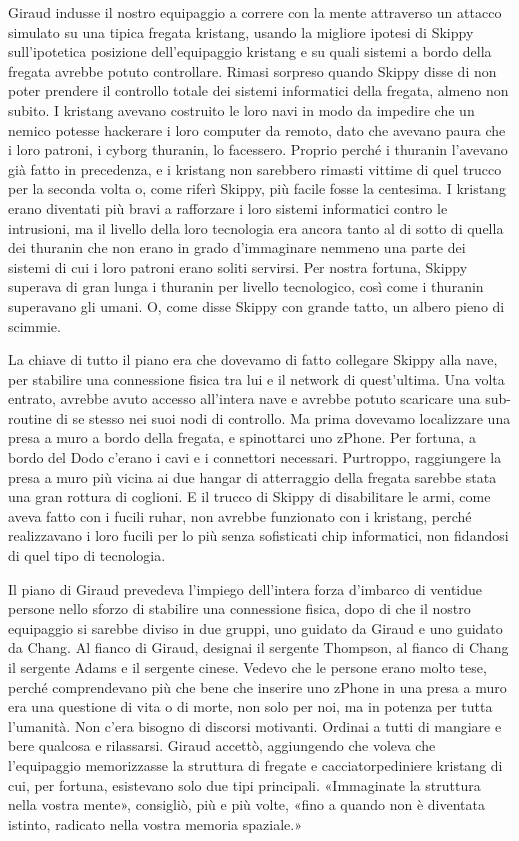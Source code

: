 Giraud indusse il nostro equipaggio a correre con la mente attraverso un
attacco simulato su una tipica fregata kristang, usando la migliore
ipotesi di Skippy sull'ipotetica posizione dell'equipaggio kristang e su
quali sistemi a bordo della fregata avrebbe potuto controllare. Rimasi
sorpreso quando Skippy disse di non poter prendere il controllo totale
dei sistemi informatici della fregata, almeno non subito. I kristang
avevano costruito le loro navi in modo da impedire che un nemico potesse
hackerare i loro computer da remoto, dato che avevano paura che i loro
patroni, i cyborg thuranin, lo facessero. Proprio perché i thuranin
l'avevano già fatto in precedenza, e i kristang non sarebbero rimasti
vittime di quel trucco per la seconda volta o, come riferì Skippy, più
facile fosse la centesima. I kristang erano diventati più bravi a
rafforzare i loro sistemi informatici contro le intrusioni, ma il
livello della loro tecnologia era ancora tanto al di sotto di quella dei
thuranin che non erano in grado d'immaginare nemmeno una parte dei
sistemi di cui i loro patroni erano soliti servirsi. Per nostra fortuna,
Skippy superava di gran lunga i thuranin per livello tecnologico, così
come i thuranin superavano gli umani. O, come disse Skippy con grande
tatto, un albero pieno di scimmie.

La chiave di tutto il piano era che dovevamo di fatto collegare Skippy
alla nave, per stabilire una connessione fisica tra lui e il network di
quest'ultima. Una volta entrato, avrebbe avuto accesso all'intera nave e
avrebbe potuto scaricare una sub-routine di se stesso nei suoi nodi di
controllo. Ma prima dovevamo localizzare una presa a muro a bordo della
fregata, e spinottarci uno zPhone. Per fortuna, a bordo del Dodo c'erano
i cavi e i connettori necessari. Purtroppo, raggiungere la presa a muro
più vicina ai due hangar di atterraggio della fregata sarebbe stata una
gran rottura di coglioni. E il trucco di Skippy di disabilitare le armi,
come aveva fatto con i fucili ruhar, non avrebbe funzionato con i
kristang, perché realizzavano i loro fucili per lo più senza sofisticati
chip informatici, non fidandosi di quel tipo di tecnologia.

Il piano di Giraud prevedeva l'impiego dell'intera forza d'imbarco di
ventidue persone nello sforzo di stabilire una connessione fisica, dopo
di che il nostro equipaggio si sarebbe diviso in due gruppi, uno guidato
da Giraud e uno guidato da Chang. Al fianco di Giraud, designai il
sergente Thompson, al fianco di Chang il sergente Adams e il sergente
cinese. Vedevo che le persone erano molto tese, perché comprendevano più
che bene che inserire uno zPhone in una presa a muro era una questione
di vita o di morte, non solo per noi, ma in potenza per tutta l'umanità.
Non c'era bisogno di discorsi motivanti. Ordinai a tutti di mangiare e
bere qualcosa e rilassarsi. Giraud accettò, aggiungendo che voleva che
l'equipaggio memorizzasse la struttura di fregate e cacciatorpediniere
kristang di cui, per fortuna, esistevano solo due tipi principali.
«Immaginate la struttura nella vostra mente», consigliò, più e più
volte, «fino a quando non è diventata istinto, radicato nella vostra
memoria spaziale.»

